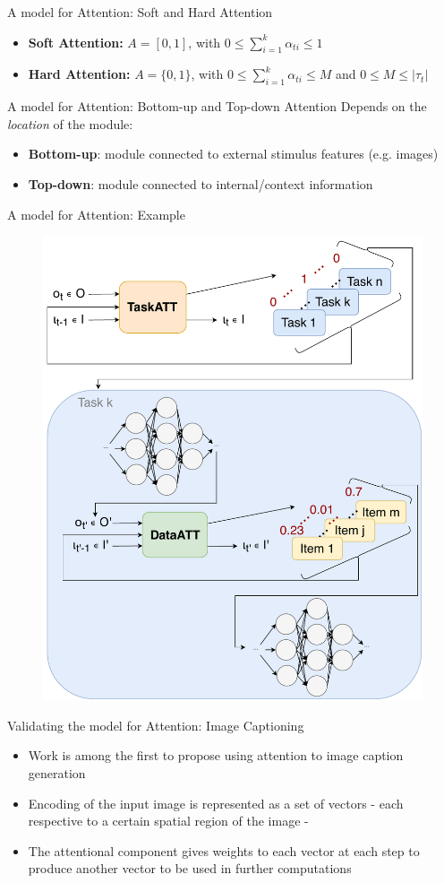 \documentclass[10pt]{beamer}
\begin{document}
\begin{frame}{A model for Attention: Soft and Hard Attention}
    \begin{itemize}
        \item \textbf{Soft Attention:}
            $A = [0, 1]$, with $0 \le \sum_{i=1}^{k} \alpha_{ti} \le 1$
        \item \textbf{Hard Attention:}
            $A = \{0, 1\}$, with $0 \le \sum_{i=1}^{k} \alpha_{ti} \le M$ and $0 \le M \le |\tau_t|$
    \end{itemize}
\end{frame}

\begin{frame}{A model for Attention: Bottom-up and Top-down Attention}
    Depends on the \emph{location} of the module:
    \begin{itemize}
        \item \textbf{Bottom-up}: module connected to external stimulus features (e.g. images)
        \item \textbf{Top-down}: module connected to internal/context information
    \end{itemize}
\end{frame}

\begin{frame}{A model for Attention: Example}
    \begin{figure}[H]
        \centering
        \includegraphics[width=0.6\linewidth]{./img/att_blocks_example.pdf}
    \end{figure}
\end{frame}

\begin{frame}{Validating the model for Attention: Image Captioning}
    \begin{itemize}
        \item Work is among the first to propose using attention to image caption generation
        \item Encoding of the input image is represented as a set of vectors - each respective to a certain spatial region of the image -
        \item The attentional component gives weights to each vector at each step to produce another vector to be used in further computations
    \end{itemize}
\end{frame}
\end{document}

